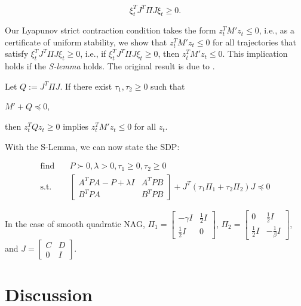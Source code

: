 \documentclass[twoside,11pt]{article}
\begin{document}
\begin{equation}
\xi_t^TJ^T\Pi J\xi_t \geq 0.
\end{equation}

\noindent
Our Lyapunov strict contraction condition takes the form $z_t^T M' z_t \leq 0$, i.e., as a certificate of uniform stability, we show that $z_t^T M' z_t \leq 0$ for all trajectories that satisfy $\xi_t^TJ^T\Pi J\xi_t \geq 0$, i.e., if $\xi_t^TJ^T\Pi J\xi_t \geq 0$, then $z_t^T M' z_t \leq 0$. This implication holds if the \textit{S-lemma} holds. The original result is due to \cite{Yak62}.

\begin{theorem}
Let $Q := J^T\Pi J$. If there exist $\tau_1, \tau_2 \geq 0$ such that

\begin{center}
$M' + Q \preceq 0$,
\end{center}

\noindent
then $z_t^T Q z_t \geq 0$ implies $z_t^T M' z_t \leq 0$ for all $z_t$.
\end{theorem}

\noindent
With the S-Lemma, we can now state the SDP:

\begin{align}
    \text{find} \quad & P \succ 0, \lambda > 0, \tau_1 \geq 0, \tau_2 \geq 0 \\
    \text{s.t.} \quad & \begin{bmatrix}
        A^TPA-P+\lambda I & A^TPB \\
        B^TPA & B^TPB
    \end{bmatrix} + J^T(\tau_1 \Pi_1 + \tau_2 \Pi_2)J \preceq 0
\end{align}

\noindent
In the case of smooth quadratic NAG, $\Pi_1 = \begin{bmatrix}
    -\gamma I & \frac{1}{2}I \\
    \frac{1}{2}I & 0
\end{bmatrix}$, $\Pi_2 = \begin{bmatrix}
    0 & \frac{1}{2}I \\
    \frac{1}{2}I & -\frac{1}{\beta}I
\end{bmatrix}$, and $J = \begin{bmatrix}
    C & D \\
    0 & I
\end{bmatrix}$.

\section{Discussion}
\end{document}

